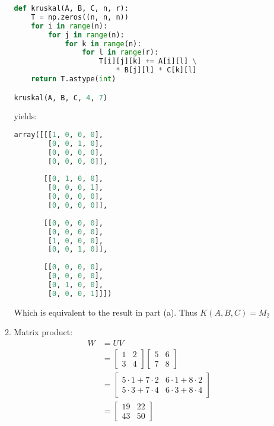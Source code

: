 \documentclass[11pt,a4paper]{article}
\begin{document}
\begin{enumerate}
\begin{enumerate}
\begin{lstlisting}[language=Python]
def kruskal(A, B, C, n, r):
    T = np.zeros((n, n, n))
    for i in range(n):
        for j in range(n):
            for k in range(n):
                for l in range(r):
                    T[i][j][k] += A[i][l] \
                        * B[j][l] * C[k][l]
    return T.astype(int)

kruskal(A, B, C, 4, 7)

                    \end{lstlisting}

                    yields:

                    \begin{lstlisting}[language=Python]
array([[[1, 0, 0, 0],
        [0, 0, 1, 0],
        [0, 0, 0, 0],
        [0, 0, 0, 0]],
            
       [[0, 1, 0, 0],
        [0, 0, 0, 1],
        [0, 0, 0, 0],
        [0, 0, 0, 0]],
            
       [[0, 0, 0, 0],
        [0, 0, 0, 0],
        [1, 0, 0, 0],
        [0, 0, 1, 0]],
            
       [[0, 0, 0, 0],
        [0, 0, 0, 0],
        [0, 1, 0, 0],
        [0, 0, 0, 1]]])
                \end{lstlisting}
                    Which is equivalent to the result in part (a). Thus $K(A, B, C) = M_2$


              \item Matrix product:
                    \begin{align*}
                        W & = UV                                            \\
                          & = \begin{bmatrix}
                                  1 & 2 \\ 3 & 4
                              \end{bmatrix} \begin{bmatrix}
                                                5 & 6 \\ 7 & 8
                                            \end{bmatrix}                  \\
                          & = \begin{bmatrix}
                                  5 \cdot 1 + 7 \cdot 2 & 6 \cdot 1 + 8 \cdot 2 \\
                                  5 \cdot 3 + 7 \cdot 4 & 6 \cdot 3 + 8 \cdot 4
                              \end{bmatrix} \\
                          & = \begin{bmatrix}
                                  19 & 22 \\ 43 & 50
                              \end{bmatrix}
                    \end{align*}


\end{enumerate}
\end{enumerate}
\end{document}
